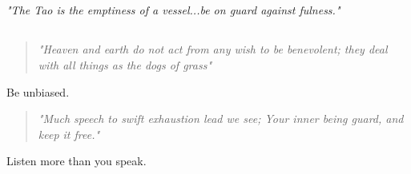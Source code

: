 \documentclass[a4paper, 10pt]{article}
\begin{document}
\subsection{}
\textit{"The Tao is the emptiness of a vessel...be on guard against fulness."}
\subsection{}
\begin{quote}
	\centering
	\textit{"Heaven and earth do not act from any wish to be benevolent; they deal with all things as the dogs of grass"}
\end{quote}
Be unbiased.
\begin{quote}
	\centering
	\textit{"Much speech to swift exhaustion lead we see; Your inner being guard, and keep it free."}
\end{quote}
Listen more than you speak.
\end{document}

